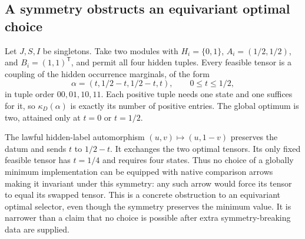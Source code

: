 \documentclass[11pt]{article}
\theoremstyle{remark}
\begin{document}
\subsection{A symmetry obstructs an equivariant optimal choice}\label{sec:symmetry}
Let $J,S,I$ be singletons. Take two modules with $H_i=\{0,1\}$, $A_i=(1/2,1/2)$, and $B_i=(1,1)^{\mathsf T}$, and permit all four hidden tuples. Every feasible tensor is a coupling of the hidden occurrence marginals, of the form
\[
 \alpha=(t,1/2-t,1/2-t,t),\qquad 0\le t\le1/2,
\]
in tuple order $00,01,10,11$. Each positive tuple needs one state and one suffices for it, so $\kappa_D(\alpha)$ is exactly its number of positive entries. The global optimum is two, attained only at $t=0$ or $t=1/2$.

The lawful hidden-label automorphism $(u,v)\mapsto(u,1-v)$ preserves the datum and sends $t$ to $1/2-t$. It exchanges the two optimal tensors. Its only fixed feasible tensor has $t=1/4$ and requires four states. Thus no choice of a globally minimum implementation can be equipped with native comparison arrows making it invariant under this symmetry: any such arrow would force its tensor to equal its swapped tensor. This is a concrete obstruction to an equivariant optimal selector, even though the symmetry preserves the minimum value. It is narrower than a claim that no choice is possible after extra symmetry-breaking data are supplied.
\end{document}
